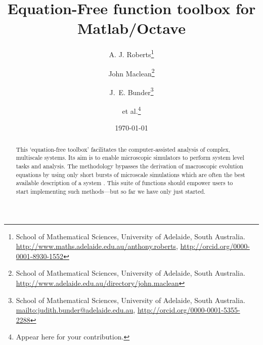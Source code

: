 \documentclass[11pt,a5paper,twoside]{article}
\title{Equation-Free function toolbox for Matlab/Octave}
\author{A. J. Roberts\thanks{%
School of Mathematical Sciences, University of Adelaide, South Australia.
\url{http://www.maths.adelaide.edu.au/anthony.roberts},
\url{http://orcid.org/0000-0001-8930-1552}}

\and John Maclean\thanks{%
School of Mathematical Sciences, University of Adelaide, South Australia.
\url{http://www.adelaide.edu.au/directory/john.maclean}}

\and J.~E. Bunder\thanks{%
School of Mathematical Sciences, University of Adelaide, South Australia.
\protect\url{mailto:judith.bunder@adelaide.edu.au},
\protect\url{http://orcid.org/0000-0001-5355-2288}}
\and et al.\thanks{Appear here for your contribution.}
}
\date{\today}
\makeatletter
\def\fancyvrbStartStop{%
  \edef\FancyVerbStartString{\@percentchar\@charrb} 
  \edef\FancyVerbStopString{\@percentchar\@charlb} }
\makeatother
\begin{document}

\maketitle

\begin{abstract}
This `equation-free toolbox' facilitates the computer-assisted analysis of complex, multiscale systems.
Its aim is to enable microscopic simulators to perform system level tasks and analysis.
The methodology bypasses the derivation of macroscopic evolution equations by using only short bursts of microscale simulations which are often the best available description of a system
\cite[e.g.]{Kevrekidis09a, Kevrekidis04a, Kevrekidis03b}.
This suite of functions should empower users to start implementing such methods---but so far we have only just started.
\end{abstract}

\tableofcontents
{}


\fancyvrbStartStop 



%

%


%

%

\appendix
\let\FancyVerbStartString\relax 
\let\FancyVerbStopString\relax




\end{document}
